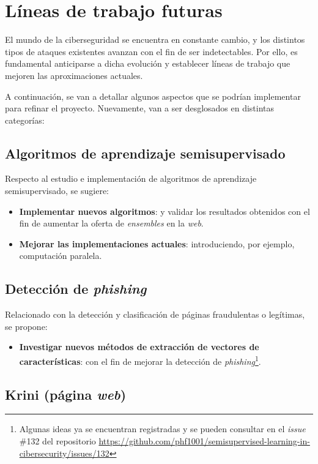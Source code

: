 \section{Líneas de trabajo futuras}

El mundo de la ciberseguridad se encuentra en constante cambio, y los distintos tipos de ataques existentes avanzan con el fin de ser indetectables. Por ello, es fundamental anticiparse a dicha evolución y establecer líneas de trabajo que mejoren las aproximaciones actuales.

A continuación, se van a detallar algunos aspectos que se podrían implementar para refinar el proyecto. Nuevamente, van a ser desglosados en distintas categorías:

\subsection{Algoritmos de aprendizaje semisupervisado}

Respecto al estudio e implementación de algoritmos de aprendizaje semisupervisado, se sugiere:

\begin{itemize}
	\item \textbf{Implementar nuevos algoritmos}: y validar los resultados obtenidos con el fin de aumentar la oferta de \textit{ensembles} en la \textit{web}.
	\item \textbf{Mejorar las implementaciones actuales}: introduciendo, por ejemplo, computación paralela.
\end{itemize}

\subsection{Detección de \textit{phishing}}

Relacionado con la detección y clasificación de páginas fraudulentas o legítimas, se propone:

\begin{itemize}
	\item \textbf{Investigar nuevos métodos de extracción de vectores de características}: con el fin de mejorar la detección de \textit{phishing}\footnote{Algunas ideas ya se encuentran registradas y se pueden consultar en el \textit{issue} \#132 del repositorio \url{https://github.com/phf1001/semisupervised-learning-in-cibersecurity/issues/132}}.
\end{itemize}


\subsection{Krini (página \textit{web})}

